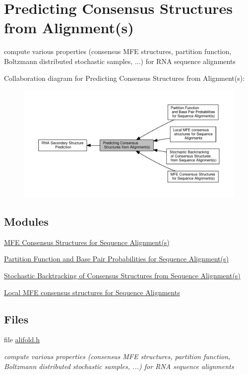 \hypertarget{group__consensus__fold}{}\section{Predicting Consensus Structures from Alignment(s)}
\label{group__consensus__fold}


compute various properties (consensus M\+F\+E structures, partition function, Boltzmann distributed stochastic samples, ...) for R\+N\+A sequence alignments  


Collaboration diagram for Predicting Consensus Structures from Alignment(s)\+:
\nopagebreak
\begin{figure}[H]
\begin{center}
\leavevmode
\includegraphics[width=350pt]{group__consensus__fold}
\end{center}
\end{figure}
\subsection*{Modules}
\begin{DoxyCompactItemize}
\item 
\hyperlink{group__consensus__mfe__fold}{M\+F\+E Consensus Structures for Sequence Alignment(s)}
\item 
\hyperlink{group__consensus__pf__fold}{Partition Function and Base Pair Probabilities for Sequence Alignment(s)}
\item 
\hyperlink{group__consensus__stochbt}{Stochastic Backtracking of Consensus Structures from Sequence Alignment(s)}
\item 
\hyperlink{group__local__consensus__fold}{Local M\+F\+E consensus structures for Sequence Alignments}
\end{DoxyCompactItemize}
\subsection*{Files}
\begin{DoxyCompactItemize}
\item 
file \hyperlink{alifold_8h}{alifold.\+h}
\begin{DoxyCompactList}\small\item\em compute various properties (consensus M\+F\+E structures, partition function, Boltzmann distributed stochastic samples, ...) for R\+N\+A sequence alignments \end{DoxyCompactList}\end{DoxyCompactItemize}
